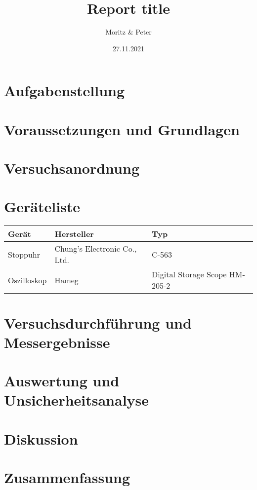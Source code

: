 \documentclass{article}
\title{Report title}
\author{Moritz \& Peter}
\date{27.11.2021}
\begin{document}
  \maketitle

  \tableofcontents
  \newpage

  \section{Aufgabenstellung}
  \section{Voraussetzungen und Grundlagen}
  \section{Versuchsanordnung}
  \section{Geräteliste}
  \begin{tabular}{|l|l|l|}
    \hline
    \textbf{Gerät} & \textbf{Hersteller}          & \textbf{Typ}                   \\
    \hline
    Stoppuhr       & Chung's Electronic Co., Ltd. & C-563                          \\ \hline
    Oszilloskop    & Hameg                        & Digital Storage Scope HM-205-2 \\ \hline
  \end{tabular}

  \section{Versuchsdurchführung und Messergebnisse}
  \section{Auswertung und Unsicherheitsanalyse}
  \section{Diskussion}
  \section{Zusammenfassung}

  \newpage
  \listoftables
  \listoffigures
\end{document}
